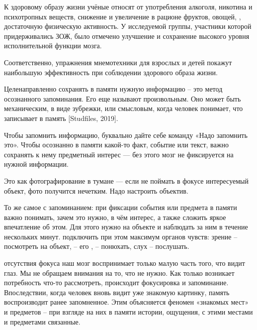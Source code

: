 К здоровому образу жизни учёные относят  от употребления алкоголя, никотина и психотропных веществ, снижение   и увеличение в рационе фруктов, овощей, , достаточную физическую активность. У исследуемой группы, участники которой придерживались ЗОЖ, было отмечено улучшение и сохранение высокого уровня исполнительной функции мозга.

Соответственно, упражнения мнемотехники для взрослых и детей покажут наибольшую эффективность при соблюдении здорового образа жизни.

\textbf{ }

Целенаправленно сохранять в памяти нужную информацию – это метод осознанного запоминания. Его еще называют произвольным. Оно может быть механическим, в виде зубрежки, или смысловым, когда человек понимает, что записывает в память [Studfiles, 2019].

\begin{fancyquotes}
    Чтобы запомнить информацию, буквально дайте себе команду «Надо запомнить это». Чтобы осознанно  в памяти какой-то факт, событие или текст, важно сохранять к нему предметный интерес --- без этого мозг не фиксируется на нужной информации.
\end{fancyquotes}

Это как фотографирование в тумане --- если не поймать в фокусе интересуемый объект, фото получится нечетким. Надо настроить объектив.

То же самое с запоминанием: при фиксации события или предмета в памяти важно понимать, зачем это нужно, в чём интерес, а также сложить яркое впечатление об этом. Для этого нужно  на объекте и наблюдать за ним в течение нескольких минут.  подключить при этом максимум органов чувств: зрение – посмотреть на объект,  –  его ,  – понюхать, слух – послушать.

 отсутствия фокуса наш мозг воспринимает только малую часть того, что видит глаз. Мы не обращаем внимания на то, что не нужно. Как только возникает потребность что-то рассмотреть, происходит фокусировка и запоминание. Впоследствии, когда человек вновь видит уже знакомую картинку, память воспроизводит ранее запомненное. Этим объясняется феномен «знакомых мест» и предметов – при взгляде на них в памяти  истории, ощущения, с этими местами и предметами связанные.

